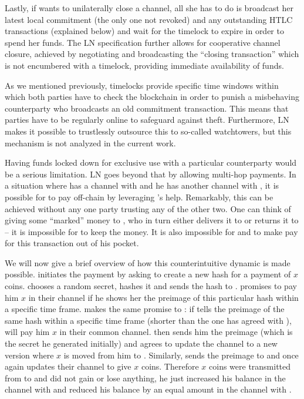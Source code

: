     Lastly, if \alice{} wants to unilaterally close a channel, all she has to do
    is broadcast her latest local commitment (the only one not revoked)
    and any outstanding HTLC transactions (explained below) and wait
    for the timelock to expire in order to spend her funds. The LN specification
    further allows for cooperative channel closure, achieved by negotiating and
    broadcasting the ``closing transaction'' which is not encumbered
    with a timelock, providing immediate availability of funds.

    As we mentioned previously, timelocks provide specific time windows within
    which both
    parties have to check the blockchain in order to punish a misbehaving
    counterparty who  broadcasts an old commitment transaction. This means that
    parties have to be regularly online to safeguard against theft.
    Furthermore, LN makes it possible to trustlessly outsource this to
    so-called watchtowers, but this mechanism is not analyzed in the current
    work.

    Having funds locked down for exclusive use with a particular counterparty
    would be a serious limitation. LN goes beyond that by allowing multi-hop
    payments. In a situation where \alice{} has a channel with \bob{} and he has
    another channel with \charlie{}, it is possible for \alice{} to pay
    \charlie{} off-chain by leveraging \bob's help. Remarkably, this can be
    achieved without any one party trusting any of the other two. One can think
    of \alice{} giving some ``marked'' money to \bob{}, who in turn either
    delivers it to \charlie{} or returns it to \alice{} -- it is impossible for
    \bob{} to keep the money. It is also impossible for \alice{} and \charlie{}
    to make \bob{} pay for this transaction out of his pocket.

    We will now give a brief overview of how this counterintuitive dynamic
    is made possible. \alice{} initiates the payment by asking \charlie{} to
    create a new hash for a payment of $x$ coins. \charlie{} chooses a random
    secret, hashes it and sends the hash to \alice. \alice{} promises \bob{} to
    pay him $x$ in their channel if he shows her the preimage of this particular
    hash within a specific time frame. \bob{} makes the same promise to
    \charlie{}: if \charlie{} tells \bob{} the preimage of the same hash within
    a specific time frame (shorter than the one \bob{} has agreed with
    \alice{}), \bob{} will pay him $x$ in their common channel. \charlie{} then
    sends him the preimage (which is the secret he generated initially) and
    \bob{} agrees to update the channel to a new version where $x$ is moved from
    him to \charlie. Similarly, \bob{} sends the preimage to \alice{} and once
    again \alice{} updates their channel to give \bob{} $x$ coins. Therefore $x$
    coins were transmitted from \alice{} to \charlie{} and \bob{} did not gain
    or lose anything, he just increased his balance in the channel with \alice{}
    and reduced his balance by an equal amount in the channel with \charlie.

